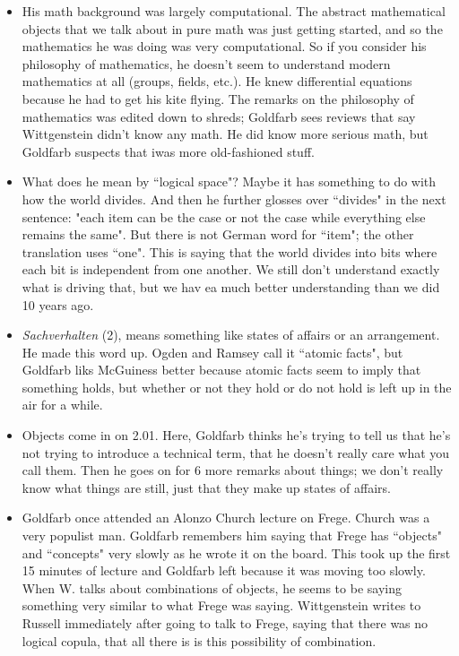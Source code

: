 \documentclass[12pt]{article}
\theoremstyle{definition}
\begin{document}
\begin{itemize}
    \item His math background was largely computational. The abstract mathematical objects that we talk about in pure math was just getting started, and so the mathematics he was doing was very computational. So if you consider his philosophy of mathematics, he doesn't seem to understand modern mathematics at all (groups, fields, etc.). He knew differential equations because he had to get his kite flying. The remarks on the philosophy of mathematics was edited down to shreds; Goldfarb sees reviews that say Wittgenstein didn't know any math. He did know more serious math, but Goldfarb suspects that iwas more old-fashioned stuff.
    \item What does he mean by ``logical space"? Maybe it has something to do with how the world divides. And then he further glosses over ``divides" in the next sentence: "each item can be the case or not the case while everything else remains the same". But there is not German word for ``item"; the other translation uses ``one". This is saying that the world divides into bits where each bit is independent from one another. We still don't understand exactly what is driving that, but we hav ea much better understanding than we did 10 years ago.
    \item \textit{Sachverhalten} (2), means something like states of affairs or an arrangement. He made this word up. Ogden and Ramsey call it ``atomic facts", but Goldfarb liks McGuiness better because atomic facts seem to imply that something holds, but whether or not they hold or do not hold is left up in the air for a while.
    \item Objects come in on 2.01. Here, Goldfarb thinks he's trying to tell us that he's not trying to introduce a technical term, that he doesn't really care what you call them. Then he goes on for 6 more remarks about things; we don't really know what things are still, just that they make up states of affairs.
    \item Goldfarb once attended an Alonzo Church lecture on Frege. Church was a very populist man. Goldfarb remembers him saying that Frege has ``objects" and ``concepts" very slowly as he wrote it on the board. This took up the first 15 minutes of lecture and Goldfarb left because it was moving too slowly. When W. talks about combinations of objects, he seems to be saying something very similar to what Frege was saying. Wittgenstein writes to Russell immediately after going to talk to Frege, saying that there was no logical copula, that all there is is this possibility of combination.

\end{itemize}
\end{document}

